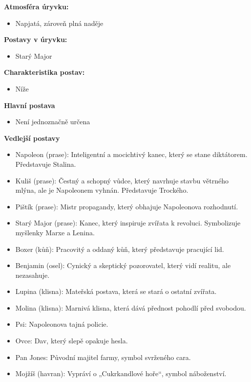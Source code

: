 \documentclass[12pt,a4paper]{article}
\begin{document}
\begin{tcolorbox}[breakable]

\textbf{Atmosféra úryvku:}
\begin{itemize}
\item Napjatá, zároveň plná naděje
\end{itemize}

\textbf{Postavy v úryvku:}
\begin{itemize}
\item Starý Major
\end{itemize}

\textbf{Charakteristika postav:}
\begin{itemize}
\item Níže
\end{itemize}

\textbf{Hlavní postava}
\begin{itemize}
\item Není jednoznačně určena
\end{itemize}

\textbf{Vedlejší postavy}
\begin{itemize}
\item Napoleon (prase): Inteligentní a mocichtivý kanec, který se stane diktátorem. Představuje Stalina.
\item Kuliš (prase): Čestný a schopný vůdce, který navrhuje stavbu větrného mlýna, ale je Napoleonem vyhnán. Představuje Trockého.
\item Pištík (prase): Mistr propagandy, který obhajuje Napoleonova rozhodnutí.
\item Starý Major (prase): Kanec, který inspiruje zvířata k revoluci. Symbolizuje myšlenky Marxe a Lenina.
\item Boxer (kůň): Pracovitý a oddaný kůň, který představuje pracující lid.
\item Benjamin (osel): Cynický a skeptický pozorovatel, který vidí realitu, ale nezasahuje.
\item Lupina (klisna): Mateřská postava, která se stará o ostatní zvířata.
\item Molina (klisna): Marnivá klisna, která dává přednost pohodlí před svobodou.
\item Psi: Napoleonova tajná policie.
\item Ovce: Dav, který slepě opakuje hesla.
\item Pan Jones: Původní majitel farmy, symbol svrženého cara.
\item Mojžíš (havran): Vypráví o „Cukrkandlové hoře“, symbol náboženství.
\end{itemize}


\end{tcolorbox}
\end{document}
